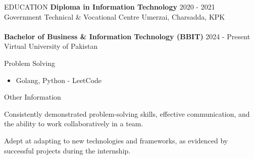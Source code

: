 \documentclass{resume}
\begin{document}
\begin{rSection}{EDUCATION}
    {\bf Diploma in Information Technology} \hfill {2020 - 2021}
    \\
        Government Technical & Vocational Centre Umerzai, Charsadda, KPK
    \\
    \\
    {\bf Bachelor of Business \& Information Technology (BBIT)} \hfill {2024 - Present}
    \\
    Virtual University of Pakistan
    \\
\end{rSection}

\begin{rSection}{Problem Solving}
    \begin{itemize}
        \item Golang, Python - LeetCode \href{https://leetcode.com/csaqibshah/}{}
    \end{itemize}
\end{rSection}

\begin{rSection}{Other Information}
    \item Consistently demonstrated problem-solving skills, effective communication, and the ability to work collaboratively in a team.
    \item Adept at adapting to new technologies and frameworks, as evidenced by successful projects during the internship.
\end{rSection}
\end{document}
